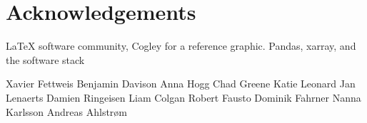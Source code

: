 \documentclass[review,jog]{igs}
\begin{document}


\section{Acknowledgements}

LaTeX software community, Cogley for a reference graphic.
Pandas, xarray, and the software stack

Xavier Fettweis
Benjamin Davison
Anna Hogg
Chad Greene
Katie Leonard
Jan Lenaerts
Damien Ringeisen
Liam Colgan
Robert Fausto
Dominik Fahrner
Nanna Karlsson
Andreas Ahlstrøm




\end{document}

